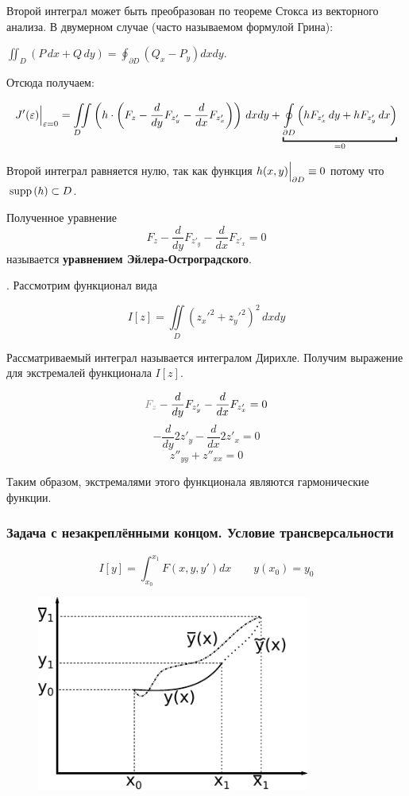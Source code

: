 \documentclass[12pt]{article}
\begin{document}
			Второй интеграл может быть преобразован по теореме Стокса из векторного анализа. В двумерном случае (часто называемом формулой Грина):

			$\iint_{D} (P\,dx + Q\,dy) = \oint_{\partial D} (Q_x - P_y) dx dy$.

			Отсюда получаем:

			$$
				J'(\varepsilon)\lims{\varepsilon = 0}{} = 
				\underset{D\hspace{10pt}}{\iint} \left( h\cdot\left(F_z - \frac{d}{dy}F_{z'_y} - \frac{d}{dx}F_{z'_x}\right) \right) \,dxdy
				+ \underbracket{\underset{\partial D}{\oint} \left(hF_{z'_x}\,dy + hF_{z'_y}\,dx \right)}_{=0}
			$$

			Второй интеграл равняется нулю, так как функция $h(x, y)\Big|_{\partial D}^{} \equiv 0$ потому что $\,\text{supp}\,(h) \subset D$.

			Полученное уравнение
			$$F_z - \frac{d}{dy}F_{z'_y} - \frac{d}{dx}F_{z'_x} = 0$$
			называется \textbf{уравнением Эйлера-Остроградского}.

			. Рассмотрим функционал вида 
	
				$$I[z] = \iint\limits_D (z_x'^2 + z_y'^2)^2 \,dxdy$$
	
				Рассматриваемый интеграл называется интегралом Дирихле. Получим выражение для экстремалей
				функционала $I[z]$.
	
				$$\off{F_z} - \frac{d}{dy} F_{z'_y} - \frac{d}{dx} F_{z'_x} = 0$$
				$$-\frac{d}{dy} 2z'_y - \frac{d}{dx} 2z'_x = 0$$
				$$z''_{yy} + z''_{xx} = 0$$
	
				Таким образом, экстремалями этого функционала являются гармонические функции.

		\subsubsection{Задача с незакреплёнными концом. Условие трансверсальности}


			$$I[y] = \int_{x_0}^{x_1} F(x, y, y')dx \qquad y(x_0) = y_0$$
	
			\begin{figure}
				\includegraphics[width=0.8\textwidth]{./../Graphics/Lectures-12-unknowntask.pdf}
			\end{figure}
	
\end{document}
